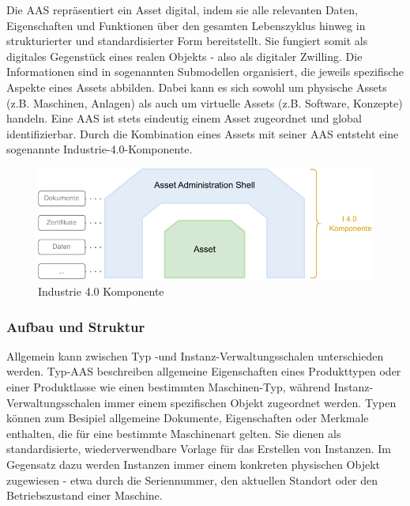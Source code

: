 Die AAS repräsentiert ein Asset digital, indem sie alle relevanten Daten, Eigenschaften und Funktionen über den gesamten Lebenszyklus hinweg in strukturierter und standardisierter Form bereitstellt. 
Sie fungiert somit als digitales Gegenstück eines realen Objekts - also als digitaler Zwilling.
Die Informationen sind in sogenannten Submodellen organisiert, die jeweils spezifische Aspekte eines Assets abbilden.
Dabei kann es sich sowohl um physische Assets (z.B. Maschinen, Anlagen) als auch um virtuelle Assets (z.B. Software, Konzepte) handeln. 
Eine AAS ist stets eindeutig einem Asset zugeordnet und global identifizierbar. 
Durch die Kombination eines Assets mit seiner AAS entsteht eine sogenannte Industrie-4.0-Komponente.

\vspace{2em}
\begin{figure}[htbp]
    \centering
    \includegraphics[width=1\textwidth]{Bilder/i4_komponente_neu.pdf}
    \caption{Industrie 4.0 Komponente}
    \label{fig:klassifizierungDT}
\end{figure}

\subsubsection{Aufbau und Struktur}
Allgemein kann zwischen Typ -und Instanz-Verwaltungsschalen unterschieden werden.
Typ-AAS beschreiben allgemeine Eigenschaften eines Produkttypen oder einer Produktlasse wie einen bestimmten Maschinen-Typ, während Instanz-Verwaltungsschalen immer einem spezifischen Objekt zugeordnet werden.
Typen können zum Besipiel allgemeine Dokumente, Eigenschaften oder Merkmale enthalten, die für eine bestimmte Maschinenart gelten.
Sie dienen als standardisierte, wiederverwendbare Vorlage für das Erstellen von Instanzen.
Im Gegensatz dazu werden Instanzen immer einem konkreten physischen Objekt zugewiesen - etwa durch die Seriennummer, den aktuellen Standort oder den Betriebszustand einer Maschine.

